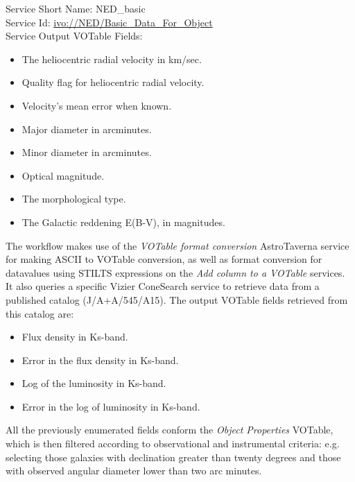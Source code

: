 \documentclass[final,authoryear,5p,times,twocolumn]{elsarticle}
\begin{document}
\begin{minipage}[h]{0.99\columnwidth}
  \small \vspace{\baselineskip}
  \noindent Service Short Name: NED\_basic\\
Service Id: \url{ivo://NED/Basic\_Data\_For\_Object}\\
Service Output VOTable Fields:
\begin{itemize}
\item The heliocentric radial velocity in km/sec.
\item Quality flag for heliocentric radial velocity.
\item Velocity's mean error when known.
\item Major diameter in arcminutes.
\item Minor diameter in arcminutes.
\item Optical magnitude.
\item The morphological type.
\item The Galactic reddening E(B-V), in magnitudes.
\end{itemize}
\vspace{\baselineskip}
\end{minipage}

The workflow makes use of the \textit{VOTable format conversion} AstroTaverna service for making ASCII to VOTable conversion, as well as format conversion for datavalues using STILTS expressions on the \textit{Add column to a VOTable} services. It also queries a specific Vizier ConeSearch service to retrieve data from a published catalog (J/A+A/545/A15). The output VOTable fields retrieved from this catalog are:

\begin{minipage}[h]{0.99\columnwidth}
  \small \vspace{\baselineskip}
  \noindent 
\begin{itemize}
\item Flux density in Ks-band. 
\item Error in the flux density in Ks-band.
\item Log of the luminosity in Ks-band.
\item Error in the log of luminosity in Ks-band.
\end{itemize}
\vspace{\baselineskip}
\end{minipage}

All the previously enumerated fields conform the \textit{Object Properties} VOTable, which is then filtered according to observational and instrumental criteria: e.g. selecting those galaxies with declination greater than twenty degrees and those with observed angular diameter lower than two arc minutes. 
\end{document}
